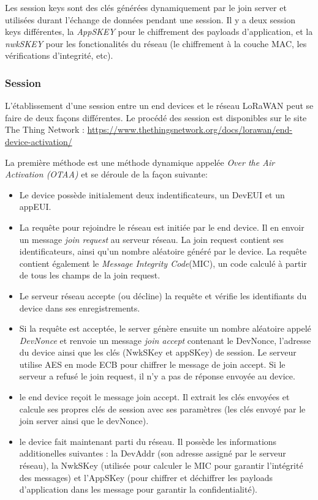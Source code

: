 Les session keys sont des clés générées dynamiquement par le join server et utilisées durant l'échange de données pendant une session. Il y a deux session keys différentes, la \textit{AppSKEY} pour le chiffrement des payloads d'application, et la \textit{nwkSKEY} pour les fonctionalités du réseau (le chiffrement à la couche MAC, les vérifications d'integrité, etc).

\subsubsection{Session}

L'établissement d'une session entre un end devices et le réseau LoRaWAN peut se faire de deux façons différentes. Le procédé des session est disponibles sur le site The Thing Network : \href{https://www.thethingsnetwork.org/docs/lorawan/end-device-activation/}{https://www.thethingsnetwork.org/docs/lorawan/end-device-activation/}

La première méthode est une méthode dynamique appelée \textit{Over the Air Activation (OTAA)} et se déroule de la façon suivante: 
\begin{itemize}
\item Le device possède initialement deux indentificateurs, un DevEUI et un appEUI.
\item La requête pour rejoindre le réseau est initiée par le end device. Il en envoir un message \textit{join request} au serveur réseau. La join request contient ses identificateurs, ainsi qu'un nombre aléatoire généré par le device. La requête contient également le \textit{Message Integrity Code}(MIC), un code calculé à partir de tous les champs de la join request.
\item Le serveur réseau accepte (ou décline) la requête et vérifie les identifiants du device dans ses enregistrements.
\item Si la requête est acceptée, le server génère ensuite un nombre aléatoire appelé \textit{DevNonce} et renvoie un message \textit{join accept} contenant le DevNonce, l'adresse du device ainsi que les clés (NwkSKey et appSKey) de session. Le serveur utilise AES en mode ECB pour chiffrer le message de join accept. Si le serveur a refusé le join request, il n'y a pas de réponse envoyée au device.
\item le end device reçoit le message join accept. Il extrait les clés envoyées et calcule ses propres clés de session avec ses paramètres (les clés envoyé par le join server ainsi que le devNonce).
\item le device fait maintenant parti du réseau. Il possède les informations additionelles suivantes : la DevAddr (son adresse assigné par le serveur réseau), la NwkSKey (utilisée pour calculer le MIC pour garantir l'intégrité des messages) et l'AppSKey (pour chiffrer et déchiffrer les payloads d'application dans les message pour garantir la confidentialité).
\end{itemize}
        
